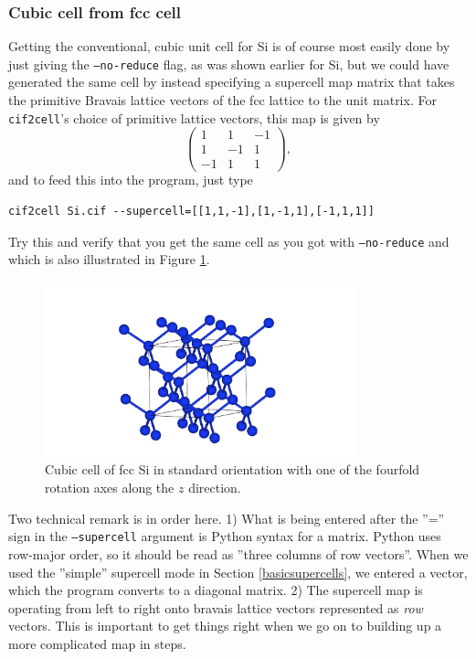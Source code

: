 \documentclass[11pt]{article}
\newcommand{\ciftocell}{\texttt{cif2cell}}
\begin{document}
\subsubsection{Cubic cell from fcc cell}
Getting the conventional, cubic unit cell for Si is of course most easily done by just giving the \texttt{--no-reduce} flag, as was shown earlier for Si, but we could have generated the same cell by instead specifying a supercell map matrix that takes the primitive Bravais lattice vectors of the fcc lattice to the unit matrix. For \ciftocell's choice of primitive lattice vectors, this map is given by
\begin{equation}
\begin{pmatrix}
1 & 1 & -1 \\
1 & -1 & 1 \\
-1 & 1 & 1
\end{pmatrix},
\end{equation}
and to feed this into the program, just type
\begin{verbatim}
cif2cell Si.cif --supercell=[[1,1,-1],[1,-1,1],[-1,1,1]]
\end{verbatim}
Try this and verify that you get the same cell as you got with \texttt{--no-reduce} and which is also illustrated in Figure \ref{cubSi}.

\begin{figure}[htbp] %
   \centering
   \includegraphics[width=0.8\textwidth]{Si_cube.pdf} 
   \caption{Cubic cell of fcc Si in standard orientation with one of the fourfold rotation axes along the $z$ direction.}
   \label{cubSi}
\end{figure}

Two technical remark is in order here. 1) What is being entered after the ''='' sign in the \texttt{--supercell} argument is Python syntax for a matrix. Python uses row-major order, so it should be read as ''three columns of row vectors''. When we used the ''simple'' supercell mode in Section \ref{basicsupercells}, we entered a vector, which the program converts to a diagonal matrix. 2) The supercell map is operating from left to right onto bravais lattice vectors represented as \emph{row} vectors. This is important to get things right when we go on to building up a more complicated map in steps.
\end{document}
